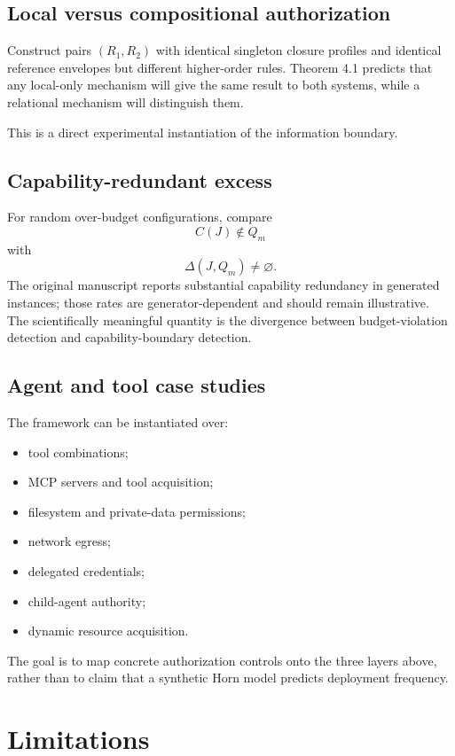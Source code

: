 \documentclass[11pt]{article}
\begin{document}
\subsection{Local versus compositional authorization}

Construct pairs $(R_1,R_2)$ with identical singleton closure profiles and identical reference envelopes but different higher-order rules. Theorem 4.1 predicts that any local-only mechanism will give the same result to both systems, while a relational mechanism will distinguish them.

This is a direct experimental instantiation of the information boundary.

\subsection{Capability-redundant excess}

For random over-budget configurations, compare
\[
C(J)\notin Q_m
\]
with
\[
\Delta(J,Q_m)\neq\varnothing.
\]
The original manuscript reports substantial capability redundancy in generated instances; those rates are generator-dependent and should remain illustrative. The scientifically meaningful quantity is the divergence between budget-violation detection and capability-boundary detection.

\subsection{Agent and tool case studies}

The framework can be instantiated over:
\begin{itemize}[leftmargin=*]
\item tool combinations;
\item MCP servers and tool acquisition;
\item filesystem and private-data permissions;
\item network egress;
\item delegated credentials;
\item child-agent authority;
\item dynamic resource acquisition.
\end{itemize}
The goal is to map concrete authorization controls onto the three layers above, rather than to claim that a synthetic Horn model predicts deployment frequency.

\section{Limitations}
\end{document}
